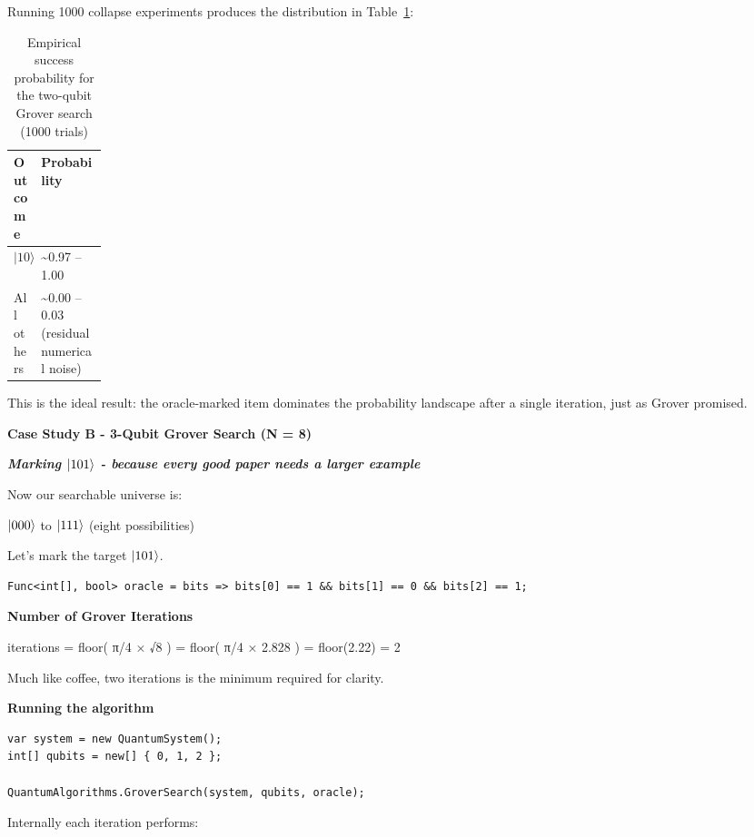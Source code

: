 \documentclass[a4paper,11pt]{article}
\begin{document}
Running 1000 collapse experiments produces the distribution in Table~\ref{tab:grover-success-prob}:

\begin{table}[htbp]
\centering
\begin{tabularx}{\linewidth}{@{}
  >{\raggedright\arraybackslash}p{0.12\linewidth}
  >{\raggedright\arraybackslash}X
@{}}
\toprule
\textbf{Outcome} & \textbf{Probability} \\
\midrule
\textbf{$\lvert 10\rangle$} & \textasciitilde0.97 -- 1.00 \\
All others & \textasciitilde0.00 -- 0.03 (residual numerical noise) \\
\bottomrule
\end{tabularx}
\caption{Empirical success probability for the two-qubit Grover search (1000 trials)}
\label{tab:grover-success-prob}
\end{table}


This is the ideal result: the oracle-marked item dominates the probability landscape after a single iteration, just as Grover promised.

\textbf{Case Study B - 3-Qubit Grover Search (N = 8)}

\emph{\textbf{Marking $\lvert 101 \rangle$ - because every good paper needs a larger example}}

Now our searchable universe is:

$\lvert 000 \rangle$ to $\lvert 111 \rangle$ (eight possibilities)

Let's mark the target $\lvert 101 \rangle$.

\begin{lstlisting}[style=codeblock]
Func<int[], bool> oracle = bits => bits[0] == 1 && bits[1] == 0 && bits[2] == 1;
\end{lstlisting}

\textbf{Number of Grover Iterations}

iterations = floor( π/4 × √8 ) = floor( π/4 × 2.828 ) = floor(2.22) = 2

Much like coffee, two iterations is the minimum required for clarity.

  \textbf{Running the algorithm}

\begin{lstlisting}[style=codeblock]
var system = new QuantumSystem();
int[] qubits = new[] { 0, 1, 2 };

QuantumAlgorithms.GroverSearch(system, qubits, oracle);
\end{lstlisting}

Internally each iteration performs:
\end{document}
